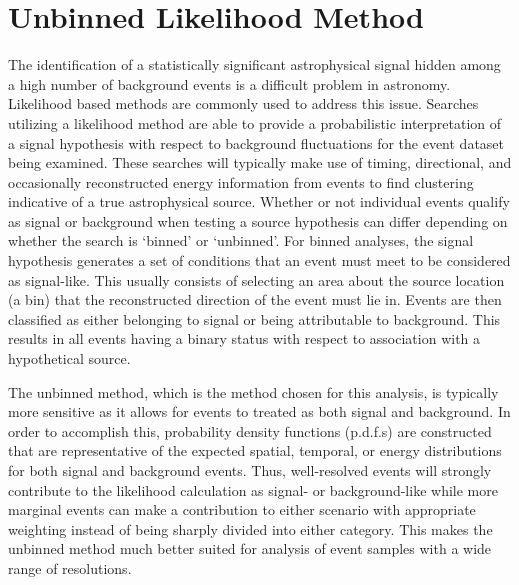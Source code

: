\documentclass{gatech-thesis}
\begin{document}
\section{Unbinned Likelihood Method}
The identification of a statistically significant astrophysical signal hidden among a high number of background events is a difficult problem in astronomy. Likelihood based methods are commonly used to address this issue. Searches utilizing a likelihood method are able to provide a probabilistic interpretation of a signal hypothesis with respect to background fluctuations for the event dataset being examined. These searches will typically make use of timing, directional, and occasionally reconstructed energy information from events to find clustering indicative of a true astrophysical source. Whether or not individual events qualify as signal or background when testing a source hypothesis can differ depending on whether the search is `binned' or `unbinned'. For binned analyses, the signal hypothesis generates a set of conditions that an event must meet to be considered as signal-like. This usually consists of selecting an area about the source location (a bin) that the reconstructed direction of the event must lie in. Events are then classified as either belonging to signal or being attributable to background. This results in all events having a binary status with respect to association with a hypothetical source. 

The unbinned method, which is the method chosen for this analysis, is typically more sensitive as it allows for events to treated as both signal and background. In order to accomplish this, probability density functions (p.d.f.s) are constructed that are representative of the expected spatial, temporal, or energy distributions for both signal and background events. Thus, well-resolved events will strongly contribute to the likelihood calculation as signal- or background-like while more marginal events can make a contribution to either scenario with appropriate weighting instead of being sharply divided into either category. This makes the unbinned method much better suited for analysis of event samples with a wide range of resolutions.
\end{document}
